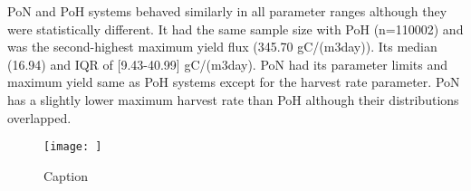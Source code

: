 \documentclass[../thesis.tex]{subfiles} %
\begin{document}
PoN and PoH systems behaved similarly in all parameter ranges although they were statistically different.  It had the same sample size with PoH (n=110002) and was the second-highest maximum yield flux (345.70 gC/(m3day)).  Its median (16.94) and IQR of [9.43-40.99] gC/(m3day).  PoN had its parameter limits and maximum yield same as PoH systems except for the harvest rate parameter.  PoN has a slightly lower maximum harvest rate than PoH although their distributions overlapped.

\begin{figure}
    \centering
    \texttt{[image: ]}
    \caption{Caption}
    \label{fig:my_label}
\end{figure}
\end{document}
